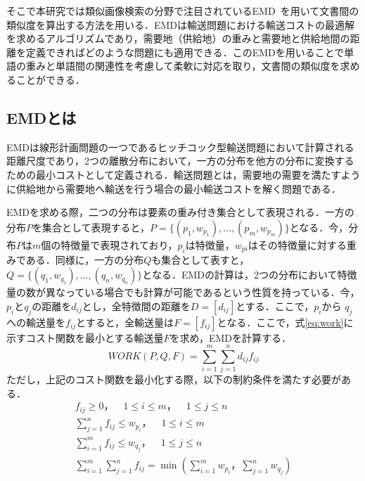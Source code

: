 \documentclass[japanese]{jnlp_1.4}
\begin{document}
そこで本研究では類似画像検索の分野で注目されているEMD~\cite{Rubner:00}を用いて文書間の類似度を算出する方法を用いる．EMDは輸送問題における輸送コストの最適解を求めるアルゴリズムであり，需要地（供給地）の重みと需要地と供給地間の距離を定義できればどのような問題にも適用できる．このEMDを用いることで単語の重みと単語間の関連性を考慮して柔軟に対応を取り，文書間の類似度を求めることができる．


\subsection{EMDとは}

EMDは線形計画問題の一つであるヒッチコック型輸送問題において計算される距離尺度であり，2つの離散分布において，一方の分布を他方の分布に変換するための最小コストとして定義される．輸送問題とは，需要地の需要を満たすように供給地から需要地へ輸送を行う場合の最小輸送コストを解く問題である．

EMDを求める際，二つの分布は要素の重み付き集合として表現される．一方の分布$P$を集合として表現すると，$P=\{(p_1,w_{p_1}),\ldots,(p_m,w_{p_m})\}$となる．今，分布$P$は$m$個の特徴量で表現されており，$p_i$は特徴量，$w_{pi}$はその特徴量に対する重みである．同様に，一方の分布$Q$も集合として表すと，$Q=\{(q_1,w_{q_1}),\ldots,(q_n,w_{q_n})\}$となる．EMDの計算は，2つの分布において特徴量の数が異なっている場合でも計算が可能であるという性質を持っている．今，$p_i$と$q_j$の距離を$d_{ij}$とし，全特徴間の距離を$D=[d_{ij}]$とする．ここで，$p_i$から $q_j$への輸送量を$f_{ij}$とすると，全輸送量は$F=[f_{ij}]$となる．ここで，式\ref{eq:work}に示すコスト関数を最小とする輸送量$F$を求め，EMDを計算する．
\begin{equation}
 WORK(P,Q,F)=\sum_{i=1}^m\sum_{j=1}^n d_{ij} f_{ij}\label{eq:work}
\end{equation}
ただし，上記のコスト関数を最小化する際，以下の制約条件を満たす必要がある．
{\allowdisplaybreaks
\begin{gather}
 f_{ij}\geq0，\quad 1\leq i \leq m，\quad 1\leq j \leq n
	\label{eq:st1}\\
 \sum_{j=1}^n f_{ij} \leq w_{p_i}，\quad 1 \leq i \leq m
	\label{eq:st2} \\
 \sum_{i=1}^m f_{ij} \leq w_{q_j}，\quad 1 \leq j \leq n
	\label{eq:st3} \\
 \sum_{i=1}^m\sum_{j=1}^n f_{ij} = \min\left(\sum_{i=1}^m w_{p_i}，\sum_{j=1}^n w_{q_j}\right)
	\label{eq:st4}
\end{gather}
}
\end{document}
